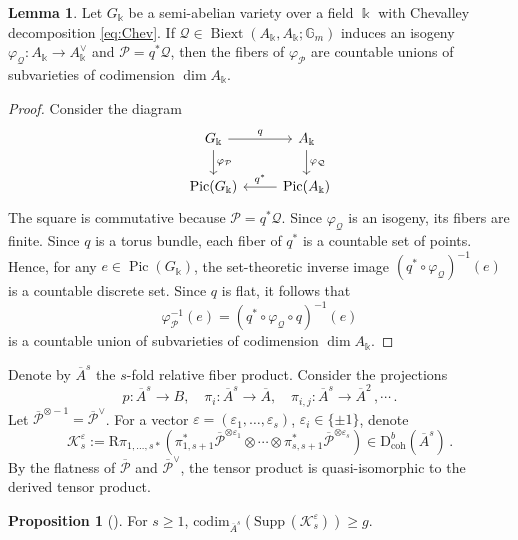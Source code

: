 \documentclass[11pt]{article}
\def\codim{\mathrm{codim}}
\def\dbcoh{\mathrm{D}^b_{\mathrm{coh}}}
\def\Pbar{\overline{\mathcal{P}}}
\newcommand{\barA}{\overline{A}}
\newcommand{\K}{\mathcal{K}}
\newcommand{\supp}{\mathrm{Supp}\,}
\newcommand{\Pic}{\operatorname{Pic}}
\theoremstyle{definition}
\newtheorem{proposition}[definition]{Proposition}
\newtheorem{lemma}[definition]{Lemma}
\begin{document}
\begin{lemma}\label{lem:semi-abelian_bound}
    Let $G_\Bbbk$ be a semi-abelian variety over a field $\Bbbk$ with Chevalley decomposition \eqref{eq:Chev}. If $\mathcal Q \in \operatorname{Biext}(A_\Bbbk,A_\Bbbk;\mathbb G_m)$ induces an isogeny $\varphi_{\mathcal Q} : A_\Bbbk \to A_\Bbbk^\vee$ and $\mathcal P = q^*\mathcal Q$, then the fibers of $\varphi_{\mathcal P}$ are countable unions of subvarieties of codimension $\dim A_{\Bbbk}$.
\end{lemma}

\begin{proof}
    Consider the diagram
    \[
    \begin{tikzcd}
        G_{\Bbbk} \ar[d,"\varphi_{\mathcal{P}}"] \ar[r,"q"] & A_\Bbbk \ar[d, "\varphi_{\mathcal{Q}}"]\\
        \Pic (G_\Bbbk) & \Pic(A_\Bbbk) \ar[l, "q^*"']
    \end{tikzcd}
    \]
    The square is commutative because $\mathcal P = q^*\mathcal Q$. Since
    $\varphi_{\mathcal Q}$ is an isogeny, its fibers are finite. Since $q$ is a torus bundle, each fiber of $q^*$ is a countable set of points. Hence, for any $e \in \Pic(G_\Bbbk)$, the set-theoretic inverse
    image $(q^* \circ \varphi_{\mathcal Q})^{-1}(e)$ is a countable discrete set. Since $q$ is flat, it follows that
    \[
    \varphi_{\mathcal P}^{-1}(e)
    =
    (q^* \circ \varphi_{\mathcal Q} \circ q)^{-1}(e)
    \]
    is a countable union of subvarieties of codimension $\dim A_\Bbbk$.
\end{proof}


Denote by $\barA^{s}$ the $s$-fold relative fiber product.
Consider the projections
\[
p : \barA^{s} \to B, \quad \pi_i :\barA^s \to \barA,\quad \pi_{i,j} : \barA^s \to \barA^2\,, \cdots\,.
\]
Let $\Pbar^{\otimes -1} = \Pbar^\vee$. For a vector $\varepsilon = (\varepsilon_1,\ldots, \varepsilon_s)$, $\varepsilon_i \in \{\pm 1\}$, denote
\[
\K_s^{\varepsilon} := \mathrm{R}\pi_{1,\dots,s*}(\pi_{1,s+1}^*\Pbar^{\otimes \varepsilon_1} \otimes \cdots \otimes \pi_{s,s+1}^*\Pbar^{\otimes \varepsilon_s}) \in \dbcoh(\barA^s)\,.
\]
By the flatness of $\Pbar$ and $\Pbar^{\vee}$, the tensor product is quasi-isomorphic to the derived tensor product.

\begin{proposition}[\cite{Arinkin2}]\label{pro:cdim}
    For $s \ge 1$, $\codim_{\barA^s} (\supp (\K^{\varepsilon}_s)) \ge g$.
\end{proposition}
\end{document}

